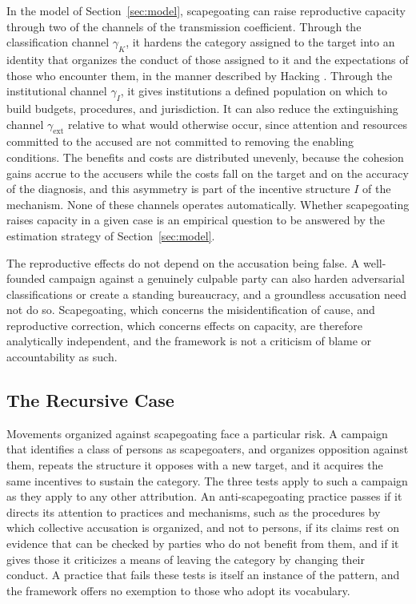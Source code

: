 \documentclass[12pt]{article}
\theoremstyle{remark}
\begin{document}
In the model of Section~\ref{sec:model}, scapegoating can raise reproductive capacity through two of the channels of the transmission coefficient. Through the classification channel $\gamma_K$, it hardens the category assigned to the target into an identity that organizes the conduct of those assigned to it and the expectations of those who encounter them, in the manner described by Hacking \cite{hacking1995}. Through the institutional channel $\gamma_I$, it gives institutions a defined population on which to build budgets, procedures, and jurisdiction. It can also reduce the extinguishing channel $\gamma_{\mathrm{ext}}$ relative to what would otherwise occur, since attention and resources committed to the accused are not committed to removing the enabling conditions. The benefits and costs are distributed unevenly, because the cohesion gains accrue to the accusers while the costs fall on the target and on the accuracy of the diagnosis, and this asymmetry is part of the incentive structure $I$ of the mechanism. None of these channels operates automatically. Whether scapegoating raises capacity in a given case is an empirical question to be answered by the estimation strategy of Section~\ref{sec:model}.

The reproductive effects do not depend on the accusation being false. A well-founded campaign against a genuinely culpable party can also harden adversarial classifications or create a standing bureaucracy, and a groundless accusation need not do so. Scapegoating, which concerns the misidentification of cause, and reproductive correction, which concerns effects on capacity, are therefore analytically independent, and the framework is not a criticism of blame or accountability as such.

\subsection{The Recursive Case}

Movements organized against scapegoating face a particular risk. A campaign that identifies a class of persons as scapegoaters, and organizes opposition against them, repeats the structure it opposes with a new target, and it acquires the same incentives to sustain the category. The three tests apply to such a campaign as they apply to any other attribution. An anti-scapegoating practice passes if it directs its attention to practices and mechanisms, such as the procedures by which collective accusation is organized, and not to persons, if its claims rest on evidence that can be checked by parties who do not benefit from them, and if it gives those it criticizes a means of leaving the category by changing their conduct. A practice that fails these tests is itself an instance of the pattern, and the framework offers no exemption to those who adopt its vocabulary.
\end{document}
